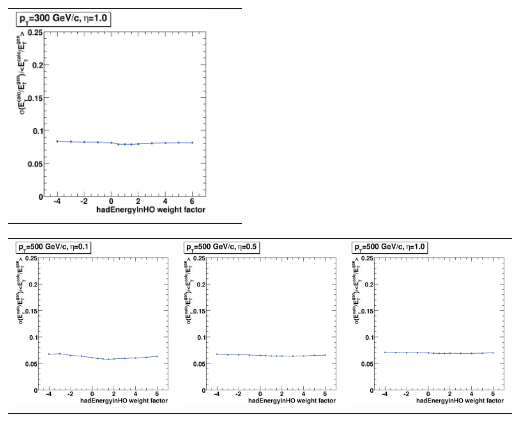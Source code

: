 \documentclass{cmspaper}
\begin{document}
\begin{appendices}
\begin{center}
\begin{tabular}{lll}
 \includegraphics[width=2in]{figs/ET_res_vs_HO_wght_eta1.0_pT300.eps} \\
\end{tabular}
\end{center}
\begin{center}
\begin{tabular}{lll}
 \includegraphics[width=2in]{figs/ET_res_vs_HO_wght_eta0.1_pT500.eps} &
 \includegraphics[width=2in]{figs/ET_res_vs_HO_wght_eta0.5_pT500.eps} &
 \includegraphics[width=2in]{figs/ET_res_vs_HO_wght_eta1.0_pT500.eps} \\

\end{tabular}
\end{center}
\end{appendices}
\end{document}
